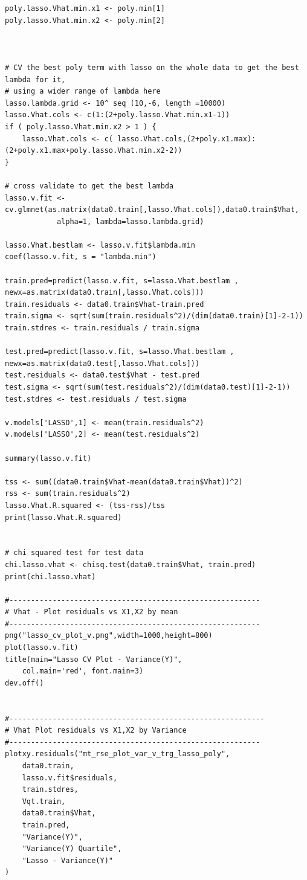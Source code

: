 \documentclass[twoside,12pt]{article}
\begin{document}
\begin{verbatim}
poly.lasso.Vhat.min.x1 <- poly.min[1]
poly.lasso.Vhat.min.x2 <- poly.min[2]



# CV the best poly term with lasso on the whole data to get the best lambda for it, 
# using a wider range of lambda here
lasso.lambda.grid <- 10^ seq (10,-6, length =10000)
lasso.Vhat.cols <- c(1:(2+poly.lasso.Vhat.min.x1-1))
if ( poly.lasso.Vhat.min.x2 > 1 ) {
	lasso.Vhat.cols <- c( lasso.Vhat.cols,(2+poly.x1.max):(2+poly.x1.max+poly.lasso.Vhat.min.x2-2))
}

# cross validate to get the best lambda
lasso.v.fit <- cv.glmnet(as.matrix(data0.train[,lasso.Vhat.cols]),data0.train$Vhat,
			alpha=1, lambda=lasso.lambda.grid)

lasso.Vhat.bestlam <- lasso.v.fit$lambda.min
coef(lasso.v.fit, s = "lambda.min")

train.pred=predict(lasso.v.fit, s=lasso.Vhat.bestlam , newx=as.matrix(data0.train[,lasso.Vhat.cols]))
train.residuals <- data0.train$Vhat-train.pred
train.sigma <- sqrt(sum(train.residuals^2)/(dim(data0.train)[1]-2-1))
train.stdres <- train.residuals / train.sigma

test.pred=predict(lasso.v.fit, s=lasso.Vhat.bestlam , newx=as.matrix(data0.test[,lasso.Vhat.cols]))
test.residuals <- data0.test$Vhat - test.pred
test.sigma <- sqrt(sum(test.residuals^2)/(dim(data0.test)[1]-2-1))
test.stdres <- test.residuals / test.sigma

v.models['LASSO',1] <- mean(train.residuals^2)
v.models['LASSO',2] <- mean(test.residuals^2)

summary(lasso.v.fit)

tss <- sum((data0.train$Vhat-mean(data0.train$Vhat))^2)
rss <- sum(train.residuals^2)
lasso.Vhat.R.squared <- (tss-rss)/tss
print(lasso.Vhat.R.squared)


# chi squared test for test data
chi.lasso.vhat <- chisq.test(data0.train$Vhat, train.pred)
print(chi.lasso.vhat)

#----------------------------------------------------------
# Vhat - Plot residuals vs X1,X2 by mean
#----------------------------------------------------------
png("lasso_cv_plot_v.png",width=1000,height=800)
plot(lasso.v.fit)
title(main="Lasso CV Plot - Variance(Y)",
	col.main='red', font.main=3)
dev.off()


#-----------------------------------------------------------
# Vhat Plot residuals vs X1,X2 by Variance
#----------------------------------------------------------
plotxy.residuals("mt_rse_plot_var_v_trg_lasso_poly",
	data0.train,
	lasso.v.fit$residuals,
	train.stdres,
	Vqt.train,
	data0.train$Vhat,
	train.pred,
	"Variance(Y)",
	"Variance(Y) Quartile",
	"Lasso - Variance(Y)"
)





\end{verbatim}
\end{document}
